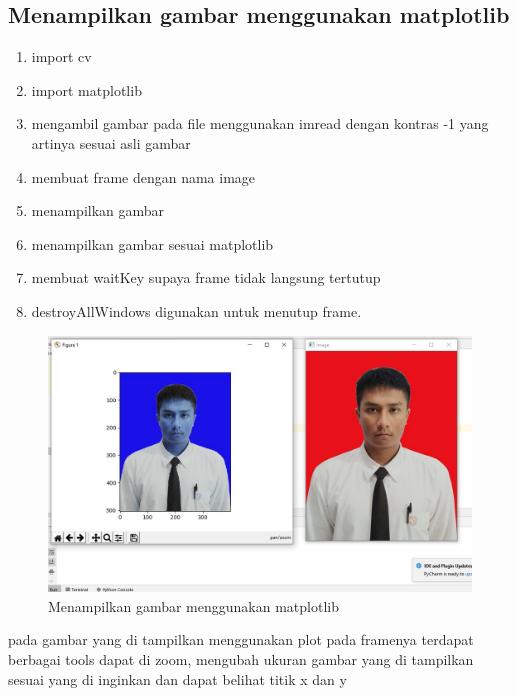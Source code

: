 \newpage
\subsection{Menampilkan gambar menggunakan matplotlib}

\begin{enumerate}
	\item import cv
	\item import matplotlib
	\item mengambil gambar pada file menggunakan imread dengan kontras -1 yang artinya sesuai asli gambar
	\item membuat frame dengan nama image
	\item menampilkan gambar
	\item menampilkan gambar sesuai matplotlib
	\item membuat waitKey supaya frame tidak langsung tertutup
	\item destroyAllWindows digunakan untuk menutup frame.
\end{enumerate}

\newpage
\begin{figure}[ht]
\centering
\includegraphics[scale=0.42]{figures/2,46,3.jpg}
\caption{Menampilkan gambar menggunakan matplotlib}
\label{contoh}
\end{figure}
pada gambar yang di tampilkan menggunakan plot pada framenya terdapat berbagai tools dapat di zoom, mengubah ukuran gambar yang di tampilkan sesuai yang di inginkan dan dapat belihat titik x dan y





\newpage
